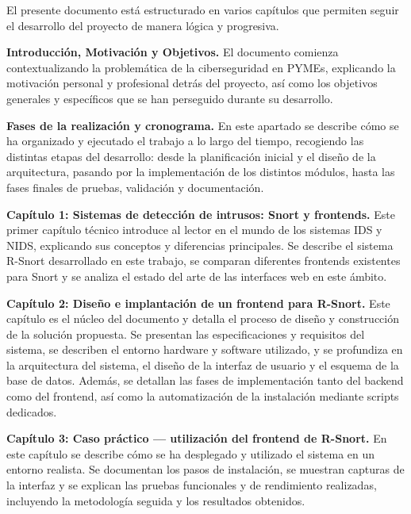 \documentclass[11pt,a4paper,twoside]{report}
\begin{document}
El presente documento está estructurado en varios capítulos que permiten seguir el desarrollo del proyecto de manera lógica y progresiva.\newline

\textbf{Introducción, Motivación y Objetivos.} El documento comienza contextualizando la problemática de la ciberseguridad en PYMEs, explicando la motivación personal y profesional detrás del proyecto, así como los objetivos generales y específicos que se han perseguido durante su desarrollo.\newline

\textbf{Fases de la realización y cronograma.} En este apartado se describe cómo se ha organizado y ejecutado el trabajo a lo largo del tiempo, recogiendo las distintas etapas del desarrollo: desde la planificación inicial y el diseño de la arquitectura, pasando por la implementación de los distintos módulos, hasta las fases finales de pruebas, validación y documentación.\newline

\textbf{Capítulo 1: Sistemas de detección de intrusos: Snort y frontends.} Este primer capítulo técnico introduce al lector en el mundo de los sistemas IDS y NIDS, explicando sus conceptos y diferencias principales. Se describe el sistema R-Snort desarrollado en este trabajo, se comparan diferentes frontends existentes para Snort y se analiza el estado del arte de las interfaces web en este ámbito.\newline

\textbf{Capítulo 2: Diseño e implantación de un frontend para R-Snort.} Este capítulo es el núcleo del documento y detalla el proceso de diseño y construcción de la solución propuesta. Se presentan las especificaciones y requisitos del sistema, se describen el entorno hardware y software utilizado, y se profundiza en la arquitectura del sistema, el diseño de la interfaz de usuario y el esquema de la base de datos. Además, se detallan las fases de implementación tanto del backend como del frontend, así como la automatización de la instalación mediante scripts dedicados.\newline

\textbf{Capítulo 3: Caso práctico — utilización del frontend de R-Snort.} En este capítulo se describe cómo se ha desplegado y utilizado el sistema en un entorno realista. Se documentan los pasos de instalación, se muestran capturas de la interfaz y se explican las pruebas funcionales y de rendimiento realizadas, incluyendo la metodología seguida y los resultados obtenidos.\newline
\end{document}

